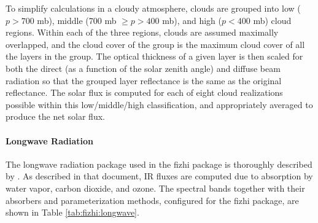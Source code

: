 To simplify calculations in a cloudy atmosphere, clouds are
grouped into low ($p>700$ mb), middle (700 mb $\ge p > 400$ mb), and high ($p < 400$ mb) cloud regions. 
Within each of the three regions, clouds are assumed maximally
overlapped, and the cloud cover of the group is the maximum
cloud cover of all the layers in the group.  The optical thickness
of a given layer is then scaled for both the direct (as a function of the
solar zenith angle) and diffuse beam radiation 
so that the grouped layer reflectance is the same as the original reflectance.
The solar flux is computed for each of eight cloud realizations possible within this
low/middle/high classification, and appropriately averaged to produce the net solar flux.

\paragraph{Longwave Radiation}

The longwave radiation package used in the fizhi package is thoroughly described by \cite{chsz:94}.
As described in that document, IR fluxes are computed due to absorption by water vapor, carbon
dioxide, and ozone.  The spectral bands together with their absorbers and parameterization methods,
configured for the fizhi package, are shown in Table \ref{tab:fizhi:longwave}.



